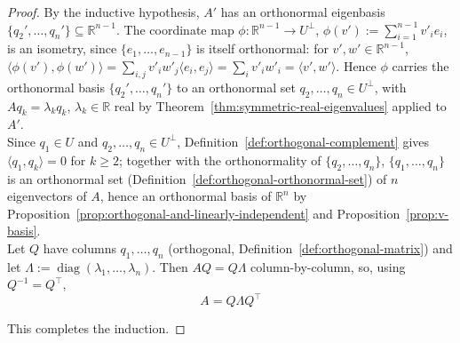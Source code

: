 \begin{proof}
			By the inductive hypothesis, $A'$ has an orthonormal eigenbasis $\{q_2',\dots,q_n'\} \subseteq \mathbb{R}^{n-1}$. The coordinate map $\phi: \mathbb{R}^{n-1} \to U^\perp$, $\phi(v') := \sum_{i=1}^{n-1} v'_i e_i$, is an isometry, since $\{e_1,\dots,e_{n-1}\}$ is itself orthonormal: for $v',w'\in\mathbb{R}^{n-1}$, $\langle \phi(v'),\phi(w')\rangle = \sum_{i,j} v'_iw'_j\langle e_i,e_j\rangle = \sum_i v'_iw'_i = \langle v',w'\rangle$. Hence $\phi$ carries the orthonormal basis $\{q_2',\dots,q_n'\}$ to an orthonormal set $q_2,\dots,q_n \in U^\perp$, with $Aq_k=\lambda_k q_k$, $\lambda_k\in\mathbb{R}$ real by Theorem~\ref{thm:symmetric-real-eigenvalues} applied to $A'$. \\
			
			Since $q_1 \in U$ and $q_2,\dots,q_n \in U^\perp$, Definition~\ref{def:orthogonal-complement} gives $\langle q_1,q_k\rangle=0$ for $k\ge2$; together with the orthonormality of $\{q_2,\dots,q_n\}$, $\{q_1,\dots,q_n\}$ is an orthonormal set (Definition~\ref{def:orthogonal-orthonormal-set}) of $n$ eigenvectors of $A$, hence an orthonormal basis of $\mathbb{R}^n$ by Proposition~\ref{prop:orthogonal-and-linearly-independent} and Proposition~\ref{prop:v-basis}. \\
			
			Let $Q$ have columns $q_1,\dots,q_n$ (orthogonal, Definition~\ref{def:orthogonal-matrix}) and let $\Lambda := \operatorname{diag}(\lambda_1,\dots,\lambda_n)$. Then $AQ = Q\Lambda$ column-by-column, so, using $Q^{-1}=Q^\top$,
			\[
				A = Q\Lambda Q^\top
			\]
			
			This completes the induction.
		\end{proof}
		
